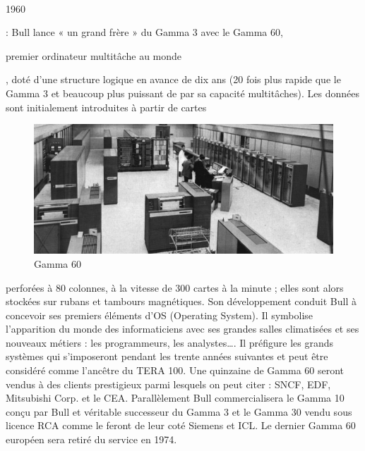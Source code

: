 \documentclass{article}
\begin{document}
		\paragraph{}
		\begin{bf}1960\end{bf}: Bull lance « un grand frère » du Gamma 3 avec le Gamma 60, \begin{bf}premier ordinateur 
		multitâche au monde\end{bf}, doté d’une structure logique en avance de dix ans (20 fois plus rapide que le Gamma 3 et 
		beaucoup plus puissant de par sa capacité multitâches). Les données sont initialement introduites à partir de cartes 
		\begin{figure}
		\includegraphics[scale=0.2]{gamma60.jpg}
		\caption{Gamma 60}
		\end{figure}
		perforées à 80 colonnes, à la vitesse de 300 cartes à la minute ; elles sont alors stockées sur rubans et tambours 
		magnétiques. Son développement conduit Bull à concevoir ses premiers éléments d’OS (Operating System). Il symbolise 
		l’apparition du monde des informaticiens avec ses grandes salles climatisées et ses nouveaux métiers : 
		les programmeurs, les analystes…. Il préfigure les grands systèmes qui s’imposeront pendant les trente années 
		suivantes et peut être considéré comme l’ancêtre du TERA 100. Une quinzaine de Gamma 60 seront vendus à des clients 
		prestigieux parmi lesquels on peut citer : SNCF, EDF, Mitsubishi Corp. et le CEA. \newline{}
		\newline{}
		Parallèlement Bull commercialisera le Gamma 10 conçu par Bull et véritable successeur du Gamma 3 et le Gamma 30 vendu 
		sous licence RCA comme le feront de leur coté Siemens et ICL. Le dernier Gamma 60 européen sera retiré du service en 
		1974.
		\newline{}
		\newline{}
		\newline{}
		\newline{}
\end{document}
